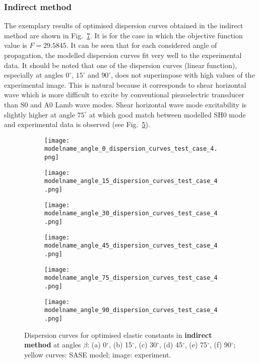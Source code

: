 \documentclass[preprint,12pt]{elsarticle}
\begin{document}
\subsubsection{Indirect method}
The exemplary results of optimised dispersion curves obtained in the indirect method are shown in Fig.~\ref{fig:optimized}. It is for the case in which the objective function value is $F=29.5845$. It can be seen that for each considered angle of propagation, the modelled dispersion curves fit very well to the experimental data. It should be noted that one of the dispersion curves (linear function), especially at angles $0^{\circ}$, $15^{\circ}$ and $90^{\circ}$, does not superimpose with high values of the experimental image. This is natural because it corresponds to shear horizontal wave which is more difficult to excite by conventional piezoelectric transducer than S0 and A0 Lamb wave modes. Shear horizontal wave mode excitability is slightly higher at angle $75^{\circ}$ at which good match between modelled SH0 mode and experimental data is observed (see Fig.~\ref{fig:dispersion75deg}). 



\begin{figure} [h!]
	\newcommand{\modelname}{ga_plain_weave_known_mass_50}
	\centering
	\begin{subfigure}[b]{0.49\textwidth}
		\centering
		\texttt{[image: \\modelname\_angle\_0\_dispersion\_curves\_test\_case\_4.png]}
		\caption{}
		\label{fig:dispersion0deg}
	\end{subfigure}
	\begin{subfigure}[b]{0.49\textwidth}
		\centering
		\texttt{[image: \\modelname\_angle\_15\_dispersion\_curves\_test\_case\_4.png]}
		\caption{}
		\label{fig:dispersion15deg}
	\end{subfigure}
	\begin{subfigure}[b]{0.49\textwidth}
		\centering
		\texttt{[image: \\modelname\_angle\_30\_dispersion\_curves\_test\_case\_4.png]}
		\caption{}
		\label{fig:dispersion30deg}
	\end{subfigure}
	\begin{subfigure}[b]{0.49\textwidth}
		\centering
		\texttt{[image: \\modelname\_angle\_45\_dispersion\_curves\_test\_case\_4.png]}
		\caption{}
		\label{fig:dispersion45deg}
	\end{subfigure}
	\begin{subfigure}[b]{0.49\textwidth}
		\centering
		\texttt{[image: \\modelname\_angle\_75\_dispersion\_curves\_test\_case\_4.png]}
		\caption{}
		\label{fig:dispersion75deg}
	\end{subfigure}
	\begin{subfigure}[b]{0.49\textwidth}
		\centering
		\texttt{[image: \\modelname\_angle\_90\_dispersion\_curves\_test\_case\_4.png]}
		\caption{}
		\label{fig:dispersion90deg}
	\end{subfigure}
	\caption{Dispersion curves for optimised elastic constants in \textbf{indirect method} at angles $\beta$: (a) 0$^{\circ}$, (b) 15$^{\circ}$, (c) 30$^{\circ}$, (d) 45$^{\circ}$, (e) 75$^{\circ}$, (f) 90$^{\circ}$; yellow curves: SASE model; image: experiment. }
	\label{fig:optimized}
\end{figure}
\end{document}
